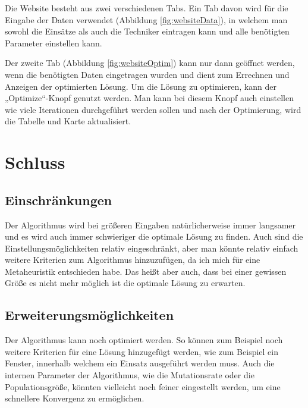 \documentclass[a4paper,notitlepage,12pt]{report}
\begin{document}
Die Website besteht aus zwei verschiedenen Tabs. Ein Tab davon wird für
die Eingabe der Daten verwendet (Abbildung \ref{fig:websiteData}), in
welchem man sowohl die Einsätze als auch die Techniker eintragen kann
und alle benötigten Parameter einstellen kann.

Der zweite Tab (Abbildung \ref{fig:websiteOptim}) kann nur dann geöffnet
werden, wenn die benötigten Daten eingetragen
wurden und dient zum Errechnen und Anzeigen der optimierten Lösung. Um
die Lösung zu optimieren, kann der „Optimize“-Knopf genutzt werden. Man kann
bei diesem Knopf auch einstellen wie viele Iterationen durchgeführt werden
sollen und nach der Optimierung, wird die Tabelle und Karte aktualisiert.

\chapter{Schluss}

\section{Einschränkungen}

Der Algorithmus wird bei größeren Eingaben natürlicherweise immer langsamer
und es wird auch immer schwieriger die optimale Lösung zu finden. Auch
sind die Einstellungsmöglichkeiten relativ eingeschränkt, aber man könnte
relativ einfach weitere Kriterien zum Algorithmus hinzuzufügen, da ich
mich für eine Metaheuristik entschieden habe. Das heißt aber auch, dass
bei einer gewissen Größe es nicht mehr möglich ist die optimale Lösung
zu erwarten.

\section{Erweiterungsmöglichkeiten}

Der Algorithmus kann noch optimiert werden. So können zum Beispiel noch
weitere Kriterien für eine Lösung hinzugefügt werden, wie zum Beispiel
ein Fenster, innerhalb welchem ein Einsatz ausgeführt werden muss.
Auch die internen Parameter der Algorithmus, wie die Mutationsrate
oder die Populationsgröße, könnten vielleicht noch feiner eingestellt
werden, um eine schnellere Konvergenz zu ermöglichen.

\newpage
{}
\nocite{*}


\end{document}
